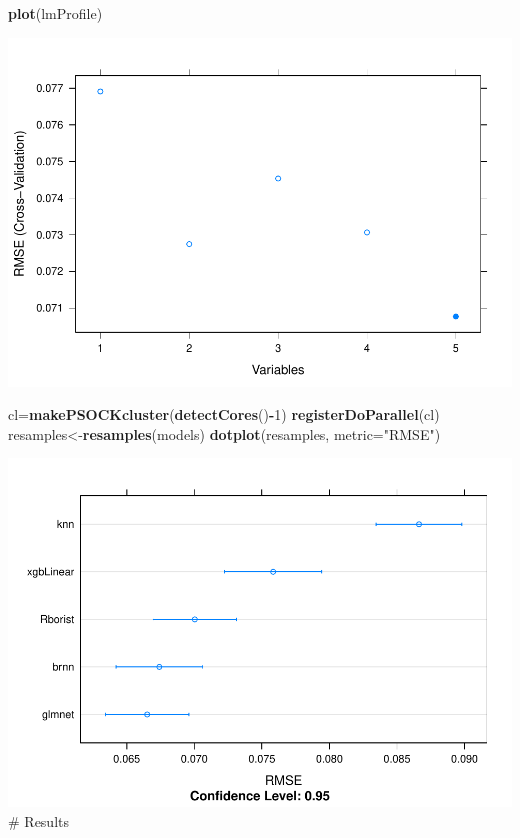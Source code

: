 \documentclass[11pt,]{article}
\newenvironment{Shaded}{\begin{snugshade}}{\end{snugshade}}
\newcommand{\DataTypeTok}[1]{\textcolor[rgb]{0.13,0.29,0.53}{#1}}
\newcommand{\DecValTok}[1]{\textcolor[rgb]{0.00,0.00,0.81}{#1}}
\newcommand{\KeywordTok}[1]{\textcolor[rgb]{0.13,0.29,0.53}{\textbf{#1}}}
\newcommand{\NormalTok}[1]{#1}
\newcommand{\OperatorTok}[1]{\textcolor[rgb]{0.81,0.36,0.00}{\textbf{#1}}}
\newcommand{\StringTok}[1]{\textcolor[rgb]{0.31,0.60,0.02}{#1}}
\begin{document}
\begin{Shaded}
\begin{Highlighting}[]
\KeywordTok{plot}\NormalTok{(lmProfile)}
\end{Highlighting}
\end{Shaded}

\includegraphics{USGradAdmission_files/figure-latex/unnamed-chunk-14-1.pdf}

\begin{Shaded}
\begin{Highlighting}[]
\NormalTok{ cl=}\KeywordTok{makePSOCKcluster}\NormalTok{(}\KeywordTok{detectCores}\NormalTok{()}\OperatorTok{-}\DecValTok{1}\NormalTok{)}
 \KeywordTok{registerDoParallel}\NormalTok{(cl)}
\NormalTok{ resamples<-}\KeywordTok{resamples}\NormalTok{(models)}
 \KeywordTok{dotplot}\NormalTok{(resamples, }\DataTypeTok{metric=}\StringTok{"RMSE"}\NormalTok{)}
\end{Highlighting}
\end{Shaded}

\includegraphics{USGradAdmission_files/figure-latex/unnamed-chunk-15-1.pdf}
\# Results
\end{document}
